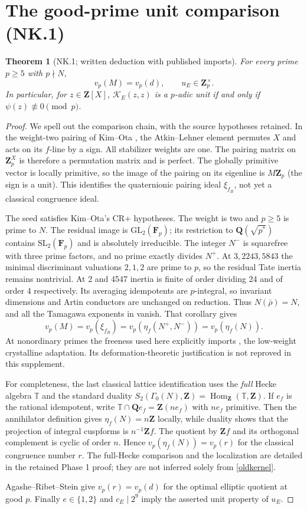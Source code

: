 \documentclass[11pt]{article}
\newcommand{\Q}{\mathbf Q}
\newcommand{\Z}{\mathbf Z}
\newcommand{\F}{\mathbf F}
\newcommand{\K}{\mathscr K_E}
\newtheorem{theorem}{Theorem}
\begin{document}
\section{The good-prime unit comparison (NK.1)}
\begin{theorem}[NK.1; written deduction with published imports]\label{unit}
For every prime $p\ge5$ with $p\nmid N$,
\[
 v_p(M)=v_p(d),\qquad u_E\in\Z_p^\times.
\]
In particular, for $z\in\Z[X]$, $\K(z,z)$ is a $p$-adic unit if and only
if $\psi(z)\not\equiv0\pmod p$.
\end{theorem}
\begin{proof}
We spell out the comparison chain, with the source hypotheses retained.
In the weight-two pairing of Kim--Ota \cite[\S6.1, (6.1)]{ko}, the
Atkin--Lehner element permutes $X$ and acts on its $f$-line by a sign.
All stabilizer weights are one. The pairing matrix on $\Z_p^X$ is therefore
a permutation matrix and is perfect. The globally primitive vector is
locally primitive, so the image of the pairing on its eigenline is
$M\Z_p$ (the sign is a unit). This identifies the quaternionic pairing
ideal $\xi_{f_B}$, not yet a classical congruence ideal.

The seed satisfies Kim--Ota's CR+ hypotheses. The weight is two and
$p\ge5$ is prime to $N$. The residual image is $\mathrm{GL}_2(\F_p)$;
its restriction to $\Q(\sqrt{p^*})$ contains $\mathrm{SL}_2(\F_p)$ and is
absolutely irreducible. The integer $N^-$ is squarefree with three prime
factors, and no prime exactly divides $N^+$. At $3,2243,5843$ the minimal
discriminant valuations $2,1,2$ are prime to $p$, so the residual Tate
inertia remains nontrivial. At 2 and 4547 inertia is finite of order
dividing 24 and of order 4 respectively. Its averaging idempotents are
$p$-integral, so invariant dimensions and Artin conductors are unchanged
on reduction. Thus $N(\bar\rho)=N$, and all the Tamagawa exponents in
\cite[Corollary 6.7]{ko} vanish. That corollary gives
\[
 v_p(M)=v_p(\xi_{f_B})
       =v_p(\eta_f(N^+,N^-))=v_p(\eta_f(N)).
\]
At nonordinary primes the freeness used here explicitly imports
\cite[Remark 6.6(1)]{ko}, the low-weight crystalline adaptation. Its
deformation-theoretic justification is not reproved in this supplement.

For completeness, the last classical lattice identification uses the
\emph{full} Hecke algebra $\mathbb T$ and the standard duality
$S_2(\Gamma_0(N),\Z)=\operatorname{Hom}_{\Z}(\mathbb T,\Z)$.
If $e_f$ is the rational idempotent, write
$\mathbb T\cap\Q e_f=\Z(ne_f)$ with $ne_f$ primitive. Then the
annihilator definition gives $\eta_f(N)=n\Z$ locally, while duality
shows that the projection of integral cuspforms is $n^{-1}\Z f$.
The quotient by $\Z f$ and its orthogonal complement is cyclic of order
$n$. Hence $v_p(\eta_f(N))=v_p(r)$ for the classical congruence number
$r$. The full-Hecke comparison and the localization are detailed in the
retained Phase 1 proof; they are not inferred solely from
\eqref{oldkernel}.

Agashe--Ribet--Stein \cite[Theorem 2.1]{ars} give $v_p(r)=v_p(d)$
for the optimal elliptic quotient at good $p$. Finally $e\in\{1,2\}$
and $c_E\mid2^9$ imply the asserted unit property of $u_E$.
\end{proof}
\end{document}
